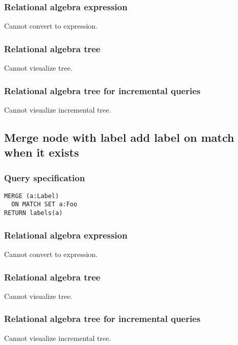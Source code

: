 \subsubsection*{Relational algebra expression}

Cannot convert to expression.

\subsubsection*{Relational algebra tree}

Cannot visualize tree.

\subsubsection*{Relational algebra tree for incremental queries}

Cannot visualize incremental tree.

\subsection{Merge node with label add label on match when it exists}

\subsubsection*{Query specification}

\begin{lstlisting}
MERGE (a:Label)
  ON MATCH SET a:Foo
RETURN labels(a)
\end{lstlisting}

\subsubsection*{Relational algebra expression}

Cannot convert to expression.

\subsubsection*{Relational algebra tree}

Cannot visualize tree.

\subsubsection*{Relational algebra tree for incremental queries}

Cannot visualize incremental tree.

